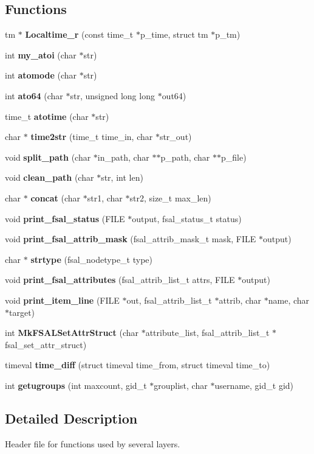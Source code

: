 \subsection*{Functions}
\begin{CompactItemize}
\item 
tm $\ast$ {\bf Localtime\_\-r} (const time\_\-t $\ast$p\_\-time, struct tm $\ast$p\_\-tm)
\item 
int {\bf my\_\-atoi} (char $\ast$str)
\item 
int {\bf atomode} (char $\ast$str)
\item 
int {\bf ato64} (char $\ast$str, unsigned long long $\ast$out64)
\item 
time\_\-t {\bf atotime} (char $\ast$str)
\item 
char $\ast$ {\bf time2str} (time\_\-t time\_\-in, char $\ast$str\_\-out)
\item 
void {\bf split\_\-path} (char $\ast$in\_\-path, char $\ast$$\ast$p\_\-path, char $\ast$$\ast$p\_\-file)
\item 
void {\bf clean\_\-path} (char $\ast$str, int len)
\item 
char $\ast$ {\bf concat} (char $\ast$str1, char $\ast$str2, size\_\-t max\_\-len)
\item 
void {\bf print\_\-fsal\_\-status} (FILE $\ast$output, fsal\_\-status\_\-t status)
\item 
void {\bf print\_\-fsal\_\-attrib\_\-mask} (fsal\_\-attrib\_\-mask\_\-t mask, FILE $\ast$output)
\item 
char $\ast$ {\bf strtype} (fsal\_\-nodetype\_\-t type)
\item 
void {\bf print\_\-fsal\_\-attributes} (fsal\_\-attrib\_\-list\_\-t attrs, FILE $\ast$output)
\item 
void {\bf print\_\-item\_\-line} (FILE $\ast$out, fsal\_\-attrib\_\-list\_\-t $\ast$attrib, char $\ast$name, char $\ast$target)
\item 
int {\bf Mk\-FSALSet\-Attr\-Struct} (char $\ast$attribute\_\-list, fsal\_\-attrib\_\-list\_\-t $\ast$fsal\_\-set\_\-attr\_\-struct)
\item 
timeval {\bf time\_\-diff} (struct timeval time\_\-from, struct timeval time\_\-to)
\item 
int {\bf getugroups} (int maxcount, gid\_\-t $\ast$grouplist, char $\ast$username, gid\_\-t gid)
\end{CompactItemize}


\subsection{Detailed Description}
Header file for functions used by several layers. 

